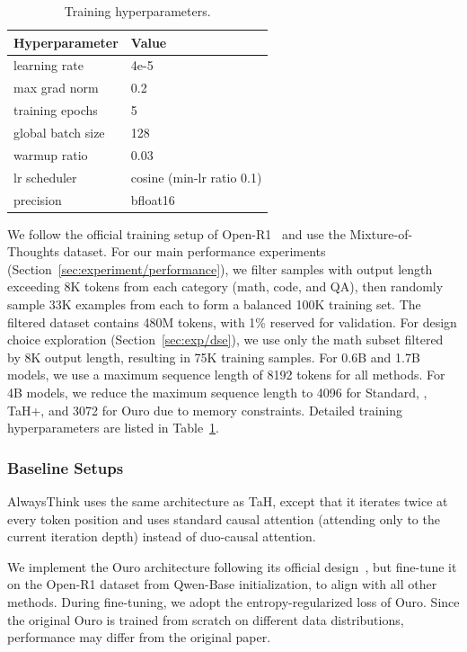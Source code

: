 \begin{table}
\vspace{-\baselineskip}
\caption{Training hyperparameters.}
    \label{tab:train_hparams}
    \centering
    \begin{tabular}{ll}
    \toprule
    \textbf{Hyperparameter} & \textbf{Value} \\
    \midrule
    learning rate & 4e-5 \\
    max grad norm & 0.2 \\
    training epochs & 5 \\
    global batch size & 128 \\
    warmup ratio & 0.03 \\
    lr scheduler & cosine (min-lr ratio 0.1) \\
    precision & bfloat16 \\
    \bottomrule
    \end{tabular}
\end{table}

We follow the official training setup of Open-R1~\citep{openr1} and use the Mixture-of-Thoughts dataset.
For our main performance experiments (Section~\ref{sec:experiment/performance}), we filter samples with output length exceeding 8K tokens from each category (math, code, and QA), then randomly sample 33K examples from each to form a balanced 100K training set.
The filtered dataset contains 480M tokens, with 1\% reserved for validation. 
For design choice exploration (Section~\ref{sec:exp/dse}), we use only the math subset filtered by 8K output length, resulting in 75K training samples.
For 0.6B and 1.7B models, we use a maximum sequence length of 8192 tokens for all methods.
For 4B models, we reduce the maximum sequence length to 4096 for Standard, \name, TaH+, and 3072 for Ouro due to memory constraints.
Detailed training hyperparameters are listed in Table~\ref{tab:train_hparams}.

\subsubsection{Baseline Setups}
\label{sec:appendix/setup/baseline}

AlwaysThink uses the same architecture as TaH, except that it iterates twice at every token position and uses standard causal attention (attending only to the current iteration depth) instead of duo-causal attention.

We implement the Ouro architecture following its official design~\citep{zhu2025ouro}, but fine-tune it on the Open-R1 dataset from Qwen-Base initialization, to align with all other methods.
During fine-tuning, we adopt the entropy-regularized loss of Ouro.
Since the original Ouro is trained from scratch on different data distributions, performance may differ from the original paper.

